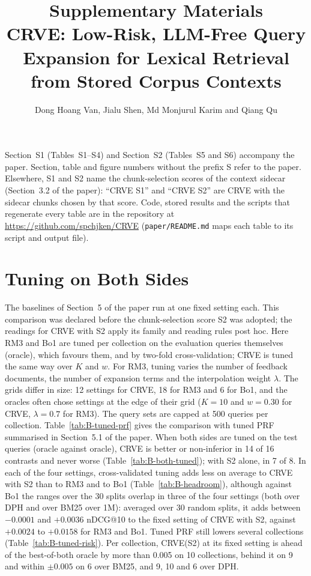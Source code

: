 \documentclass[10pt,a4paper]{article}
\title{Supplementary Materials\\[4pt]\large CRVE: Low-Risk, LLM-Free Query Expansion for Lexical Retrieval\\ from Stored Corpus Contexts}
\author{Dong Hoang Van, Jialu Shen, Md Monjurul Karim and Qiang Qu}
\date{}
\newcommand{\method}{CRVE\xspace}
\begin{document}
\maketitle

\noindent Section~S1 (Tables~S1--S4) and Section~S2 (Tables~S5 and S6) accompany the paper. Section, table and figure numbers without the prefix S refer to the paper. Elsewhere, S1 and S2 name the chunk-selection scores of the context sidecar (Section~3.2 of the paper): ``\method S1'' and ``\method S2'' are \method with the sidecar chunks chosen by that score. Code, stored results and the scripts that regenerate every table are in the repository at \url{https://github.com/spchjken/CRVE} (\texttt{paper/README.md} maps each table to its script and output file).

\section{Tuning on Both Sides}\label{app:tuned}

The baselines of Section~5 of the paper run at one fixed setting each. This comparison was declared before the chunk-selection score S2 was adopted; the readings for \method with S2 apply its family and reading rules post hoc. Here RM3 and Bo1 are tuned per collection on the evaluation queries themselves (oracle), which favours them, and by two-fold cross-validation; \method is tuned the same way over $K$ and $w$. For RM3, tuning varies the number of feedback documents, the number of expansion terms and the interpolation weight $\lambda$. The grids differ in size: 12 settings for \method, 18 for RM3 and 6 for Bo1, and the oracles often chose settings at the edge of their grid ($K = 10$ and $w = 0.30$ for \method, $\lambda = 0.7$ for RM3). The query sets are capped at 500 queries per collection.
Table~\ref{tab:B-tuned-prf} gives the comparison with tuned PRF summarised in Section~5.1 of the paper. When both sides are tuned on the test queries (oracle against oracle), \method is better or non-inferior in 14 of 16 contrasts and never worse (Table~\ref{tab:B-both-tuned}); with S2 alone, in 7 of 8. In each of the four settings, cross-validated tuning adds less on average to \method with S2 than to RM3 and to Bo1 (Table~\ref{tab:B-headroom}), although against Bo1 the ranges over the 30 splits overlap in three of the four settings (both over DPH and over BM25 over 1M): averaged over 30 random splits, it adds between $-0.0001$ and $+0.0036$ nDCG@10 to the fixed setting of \method with S2, against $+0.0024$ to $+0.0158$ for RM3 and Bo1. Tuned PRF still lowers several collections (Table~\ref{tab:B-tuned-risk}). Per collection, \method (S2) at its fixed setting is ahead of the best-of-both oracle by more than 0.005 on 10 collections, behind it on 9 and within $\pm 0.005$ on 6 over BM25, and 9, 10 and 6 over DPH.
\end{document}
